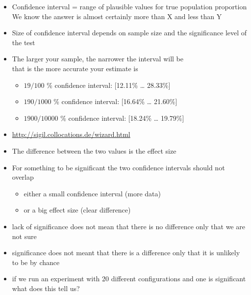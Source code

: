 \documentclass[a4paper,landscape,headrule,footrule,dvips]{foils}
\begin{document}
\begin{CJK}{UTF8}{min}
\begin{itemize}
\item Confidence interval = range of plausible values
for true population proportion
\\ We know the answer is almost certainly more than X and less than Y
\item Size of confidence interval depends on sample
size and the significance level of the test
\item The larger your sample, the narrower the interval will be
\\ that is the more accurate your estimate is
\begin{itemize}
\item $19/100$ \% confidence interval: 	[12.11\% … 28.33\%] 
\item $190/1000$ \% confidence interval: [16.64\% … 21.60\%] 
\item $1900/10000$ \% confidence interval: [18.24\% … 19.79\%] 
\end{itemize}
\item \url{http://sigil.collocations.de/wizard.html}
\end{itemize}
\begin{itemize}
\item The difference between the two values is the effect size
\item For something to be significant the two confidence intervals
  should not overlap
  \begin{itemize}
  \item either a small confidence interval (more data)
  \item or a big effect size (clear difference)
  \end{itemize}
\item lack of significance does not mean that there is no difference
  only that we are not sure
\item significance does not meant that there is a difference only that
  it is unlikely to be by chance
\item if we run an experiment with 20 different configurations and one
  is significant what does this tell us?

\end{itemize}


\end{CJK}
\end{document}
